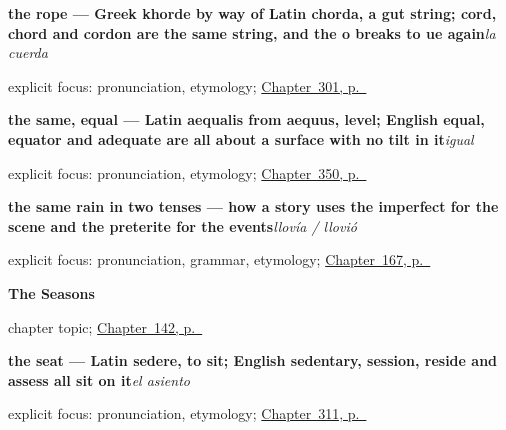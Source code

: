 \noindent\begin{minipage}[t]{\linewidth}
\raggedright
\textbf{the rope — Greek khorde by way of Latin chorda, a gut string; cord, chord and cordon are the same string, and the o breaks to ue again}\enspace\emph{la cuerda}\par
\footnotesize explicit focus: pronunciation, etymology; \hyperref[ch:mas-cosas-que-pedir]{Chapter~301, p.~\pageref*{ch:mas-cosas-que-pedir}}
\end{minipage}\par\smallskip

\noindent\begin{minipage}[t]{\linewidth}
\raggedright
\textbf{the same, equal — Latin aequalis from aequus, level; English equal, equator and adequate are all about a surface with no tilt in it}\enspace\emph{igual}\par
\footnotesize explicit focus: pronunciation, etymology; \hyperref[ch:propio-y-ajeno]{Chapter~350, p.~\pageref*{ch:propio-y-ajeno}}
\end{minipage}\par\smallskip

\noindent\begin{minipage}[t]{\linewidth}
\raggedright
\textbf{the same rain in two tenses — how a story uses the imperfect for the scene and the preterite for the events}\enspace\emph{llovía / llovió}\par
\footnotesize explicit focus: pronunciation, grammar, etymology; \hyperref[ch:spanish-narrating]{Chapter~167, p.~\pageref*{ch:spanish-narrating}}
\end{minipage}\par\smallskip

\noindent\begin{minipage}[t]{\linewidth}
\raggedright
\textbf{The Seasons}\par
\footnotesize chapter topic; \hyperref[ch:spanish-seasons]{Chapter~142, p.~\pageref*{ch:spanish-seasons}}
\end{minipage}\par\smallskip

\noindent\begin{minipage}[t]{\linewidth}
\raggedright
\textbf{the seat — Latin sedere, to sit; English sedentary, session, reside and assess all sit on it}\enspace\emph{el asiento}\par
\footnotesize explicit focus: pronunciation, etymology; \hyperref[ch:la-tienda-y-la-cuenta]{Chapter~311, p.~\pageref*{ch:la-tienda-y-la-cuenta}}
\end{minipage}\par\smallskip

